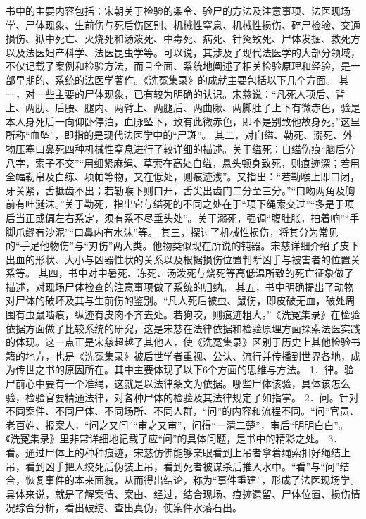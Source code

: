 \documentclass[12pt,UTF8]{ctexbook}
\begin{document}
书中的主要内容包括：宋朝关于检验的条令、验尸的方法及注意事项、法医现场学、尸体现象、生前伤与死后伤区别、机械性窒息、机械性损伤、碎尸检验、交通损伤、狱中死亡、火烧死和汤泼死、中毒死、病死、针灸致死、尸体发掘、救死方以及法医妇产科学、法医昆虫学等。可以说，其涉及了现代法医学的大部分领域，不仅记载了案例和检验方法，而且全面、系统地阐述了相关检验原理和经验，是一部早期的、系统的法医学著作。《洗冤集录》的成就主要包括以下几个方面。
其一，对一些主要的尸体现象，已有较为明确的认识。宋慈说：“凡死人项后、背上、两肋、后腰、腿内、两臂上、两腿后、两曲䐐、两脚肚子上下有微赤色，验是本人身死后一向仰卧停泊，血脉坠下，致有此微赤色，即不是别致他故身死。”这里所称“血坠”，即指的是现代法医学中的“尸斑”。
其二，对自缢、勒死、溺死、外物压塞口鼻死四种机械性窒息进行了较详细的描述。关于缢死：自缢伤痕“脑后分八字，索子不交”“用细紧麻绳、草索在高处自缢，悬头顿身致死，则痕迹深；若用全幅勒帛及白练、项帕等物，又在低处，则痕迹浅”。又指出：“若勒喉上即口闭，牙关紧，舌抵齿不出；若勒喉下则口开，舌尖出齿门二分至三分。”“口吻两角及胸前有吐涎沫。”关于勒死，指出它与缢死的不同之处在于“项下绳索交过”“多是于项后当正或偏左右系定，须有系不尽垂头处”。关于溺死，强调“腹肚胀，拍着响”“手脚爪缝有沙泥”“口鼻内有水沫”等。
其三，探讨了机械性损伤，将其分为常见的“手足他物伤”与“刃伤”两大类。他物类似现在所说的钝器。宋慈详细介绍了皮下出血的形状、大小与凶器性状的关系以及根据损伤位置判断凶手与被害者的位置关系等。
其四，书中对中暑死、冻死、汤泼死与烧死等高低温所致的死亡征象做了描述，对现场尸体检查的注意事项做了系统的归纳。
其五，书中明确提出了动物对尸体的破坏及其与生前伤的鉴别。“凡人死后被虫、鼠伤，即皮破无血，破处周围有虫鼠啮痕，纵迹有皮肉不齐去处。若狗咬，则痕迹粗大。”《洗冤集录》在检验依据方面做了比较系统的研究，这是宋慈在法律依据和检验原理方面探索法医实践的体现。这一点正是宋慈超越了其他人，使《洗冤集录》区别于历史上其他检验书籍的地方，也是《洗冤集录》被后世学者重视、公认、流行并传播到世界各地，成为传世之书的原因所在。其中主要体现了以下6个方面的思维与方法。
1．律。验尸前心中要有一个准绳，这就是以法律条文为依据。哪些尸体该验，具体该怎么验，检验官要精通法律，对各种尸体的检验及其法律规定了如指掌。
2．问。针对不同案件、不同尸体、不同场所、不同人群，“问”的内容和流程不同。“问”官员、老百姓、报案人，“问之又问”“审之又审”，问得“一清二楚”，审后“明明白白”。《洗冤集录》里非常详细地记载了应“问”的具体问题，是书中的精彩之处。
3．看。通过尸体上的种种痕迹，宋慈仿佛能够亲眼看到上吊者拿着绳索扣好绳结上吊，看到凶手把人绞死后伪装上吊，看到死者被谋杀后推入水中。“看”与“问”结合，恢复事件的本来面貌，从而得出结论，称为“事件重建”，形成了法医现场学。具体来说，就是了解案情、案由、经过，结合现场、痕迹遗留、尸体位置、损伤情况综合分析，看出破绽、查出真伪，使案件水落石出。
\end{document}
